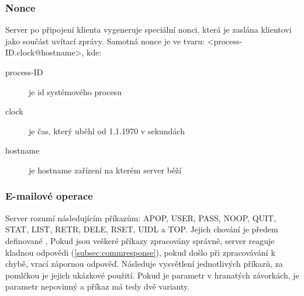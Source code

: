\documentclass[11pt,a4paper]{report}
\begin{document}
    \subsubsection{Nonce}
    \label{subsec:nonce}
    Server po připojení klienta vygeneruje speciální nonci, která je zaslána klientovi jako součást uvítací zprávy.
    Samotná nonce je ve tvaru: <process-ID.clock@hostname>, kde:
    \begin{description}
        \item [process-ID] je id systémového procesu
        \item [clock] je čas, který uběhl od 1.1.1970 v sekundách
        \item [hostname] je hostname zařízení na kterém server běží
    \end{description}
    \subsubsection{E-mailové operace}
    \label{subsec:mailoperations}
    Server rozumí následujícím příkazům: APOP, USER, PASS, NOOP, QUIT, STAT, LIST, RETR, DELE, RSET, UIDL a TOP. Jejich chování je předem definované \cite{P3Server}, Pokud jsou veškeré příkazy zpracovány správně, server reaguje kladnou odpovědi (\ref{subsec:commresponse}), pokud došlo při zpracovávání k chybě, vrací zápornou odpověď. Následuje vysvětlení jednotlivých příkazů, za pomlčkou je jejich ukázkové použití.
    Pokud je parametr v hranatých závorkách, je parametr nepovinný a příkaz má tedy dvě varianty.
\end{document}
